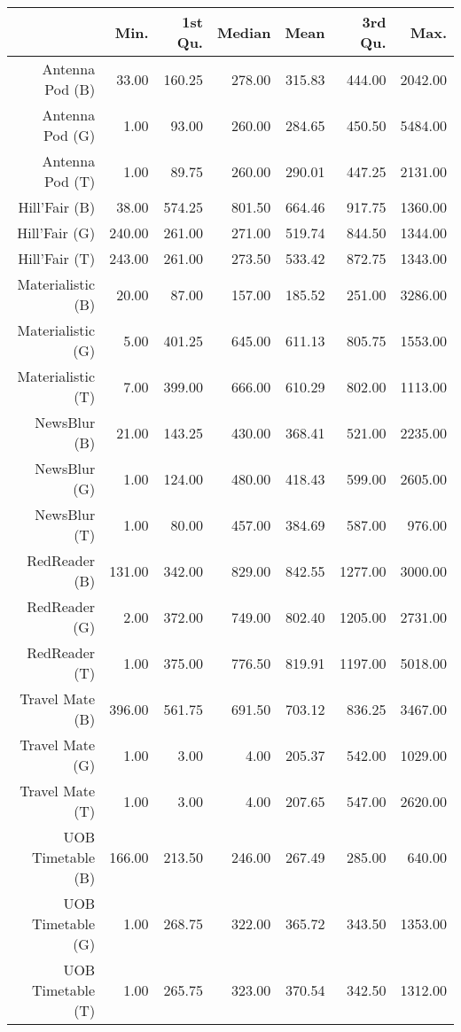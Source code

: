 \begin{table}[ht]
\centering
\begin{tabular}{rrrrrrr}
  \hline
 & Min. & 1st Qu. & Median & Mean & 3rd Qu. & Max. \\ 
  \hline
Antenna Pod (B) & 33.00 & 160.25 & 278.00 & 315.83 & 444.00 & 2042.00 \\ 
  Antenna Pod (G) & 1.00 & 93.00 & 260.00 & 284.65 & 450.50 & 5484.00 \\ 
  Antenna Pod (T) & 1.00 & 89.75 & 260.00 & 290.01 & 447.25 & 2131.00 \\ 
  Hill'Fair (B) & 38.00 & 574.25 & 801.50 & 664.46 & 917.75 & 1360.00 \\ 
  Hill'Fair (G) & 240.00 & 261.00 & 271.00 & 519.74 & 844.50 & 1344.00 \\ 
  Hill'Fair (T) & 243.00 & 261.00 & 273.50 & 533.42 & 872.75 & 1343.00 \\ 
  Materialistic (B) & 20.00 & 87.00 & 157.00 & 185.52 & 251.00 & 3286.00 \\ 
  Materialistic (G) & 5.00 & 401.25 & 645.00 & 611.13 & 805.75 & 1553.00 \\ 
  Materialistic (T) & 7.00 & 399.00 & 666.00 & 610.29 & 802.00 & 1113.00 \\ 
  NewsBlur (B) & 21.00 & 143.25 & 430.00 & 368.41 & 521.00 & 2235.00 \\ 
  NewsBlur (G) & 1.00 & 124.00 & 480.00 & 418.43 & 599.00 & 2605.00 \\ 
  NewsBlur (T) & 1.00 & 80.00 & 457.00 & 384.69 & 587.00 & 976.00 \\ 
  RedReader (B) & 131.00 & 342.00 & 829.00 & 842.55 & 1277.00 & 3000.00 \\ 
  RedReader (G) & 2.00 & 372.00 & 749.00 & 802.40 & 1205.00 & 2731.00 \\ 
  RedReader (T) & 1.00 & 375.00 & 776.50 & 819.91 & 1197.00 & 5018.00 \\ 
  Travel Mate (B) & 396.00 & 561.75 & 691.50 & 703.12 & 836.25 & 3467.00 \\ 
  Travel Mate (G) & 1.00 & 3.00 & 4.00 & 205.37 & 542.00 & 1029.00 \\ 
  Travel Mate (T) & 1.00 & 3.00 & 4.00 & 207.65 & 547.00 & 2620.00 \\ 
  UOB Timetable (B) & 166.00 & 213.50 & 246.00 & 267.49 & 285.00 & 640.00 \\ 
  UOB Timetable (G) & 1.00 & 268.75 & 322.00 & 365.72 & 343.50 & 1353.00 \\ 
  UOB Timetable (T) & 1.00 & 265.75 & 323.00 & 370.54 & 342.50 & 1312.00 \\ 
   \hline
\end{tabular}
\end{table}
